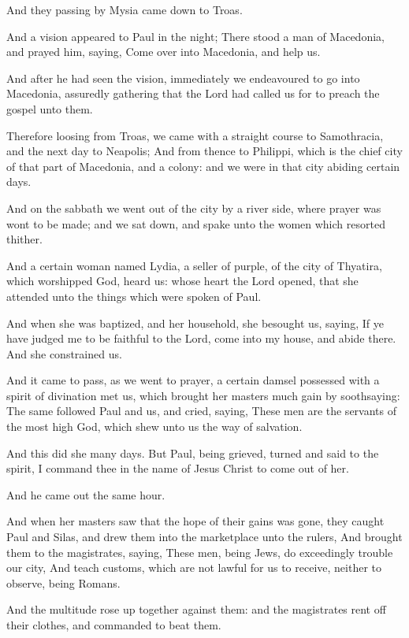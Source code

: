 \Verse And they passing by Mysia came down to Troas.

\Verse And a vision appeared to Paul in the night; There stood a man of Macedonia, and prayed him, saying, Come over into Macedonia, and help us.

\Verse And after he had seen the vision, immediately we endeavoured to go into Macedonia, assuredly gathering that the Lord had called us for to preach the gospel unto them.

\Verse Therefore loosing from Troas, we came with a straight course to Samothracia, and the next day to Neapolis; \Verse And from thence to Philippi, which is the chief city of that part of Macedonia, and a colony: and we were in that city abiding certain days.

\Verse And on the sabbath we went out of the city by a river side, where prayer was wont to be made; and we sat down, and spake unto the women which resorted thither.

\Verse And a certain woman named Lydia, a seller of purple, of the city of Thyatira, which worshipped God, heard us: whose heart the Lord opened, that she attended unto the things which were spoken of Paul.

\Verse And when she was baptized, and her household, she besought us, saying, If ye have judged me to be faithful to the Lord, come into my house, and abide there. And she constrained us.

\Verse And it came to pass, as we went to prayer, a certain damsel possessed with a spirit of divination met us, which brought her masters much gain by soothsaying: \Verse The same followed Paul and us, and cried, saying, These men are the servants of the most high God, which shew unto us the way of salvation.

\Verse And this did she many days. But Paul, being grieved, turned and said to the spirit, I command thee in the name of Jesus Christ to come out of her.

And he came out the same hour.

\Verse And when her masters saw that the hope of their gains was gone, they caught Paul and Silas, and drew them into the marketplace unto the rulers, \Verse And brought them to the magistrates, saying, These men, being Jews, do exceedingly trouble our city, \Verse And teach customs, which are not lawful for us to receive, neither to observe, being Romans.

\Verse And the multitude rose up together against them: and the magistrates rent off their clothes, and commanded to beat them.

